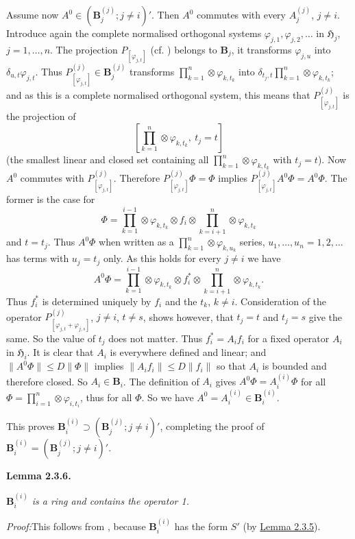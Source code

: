 \documentclass[12pt,b5paper,twoside]{article}
\newcommand{\Hspace}{\mathfrak H}
\newcommand{\B}{\mathbf B}
\newcommand{\Lemma}[1]{%
  \par\smallskip\noindent\phantomsection\label{lem:#1}\textbf{Lemma #1.}\enspace
}
\newcommand{\Proof}{\par\noindent\textit{Proof:}\enspace}
\newcommand{\lemref}[1]{\hyperref[lem:#1]{Lemma #1}}
\begin{document}
Assume now $A^0\in(\B_j^{(j)}; j\ne i)'$. Then $A^0$ commutes with every
$A_j^{(j)}$, $j\ne i$. Introduce again the complete normalised orthogonal
systems $\varphi_{j,1},\varphi_{j,2},\ldots$ in $\Hspace_j$,
$j=1,\ldots,n$. The projection $P_{[\varphi_{j,t}]}$ (cf.
\cite[p.~74]{ref16}) belongs to $\B_j$, it transforms $\varphi_{j,u}$ into
$\delta_{u,t}\varphi_{j,t}$. Thus $P_{[\varphi_{j,t}]}^{(j)}\in\B_j^{(j)}$
transforms $\prod_{k=1}^{n}\otimes\varphi_{k,t_k}$ into
$\delta_{t_j,t}\prod_{k=1}^{n}\otimes\varphi_{k,t_k}$; and as this is a
complete normalised orthogonal system, this means that
$P_{[\varphi_{j,t}]}^{(j)}$ is the projection of
\[
 \left[\prod_{k=1}^{n}\otimes\varphi_{k,t_k},\ t_j=t\right]
\]
(the smallest linear and closed set containing all
$\prod_{k=1}^{n}\otimes\varphi_{k,t_k}$ with $t_j=t$). Now $A^0$ commutes
with $P_{[\varphi_{j,t}]}^{(j)}$. Therefore
$P_{[\varphi_{j,t}]}^{(j)}\Phi=\Phi$ implies
$P_{[\varphi_{j,t}]}^{(j)}A^0\Phi=A^0\Phi$. The former is the case for
\[
 \Phi=\prod_{k=1}^{i-1}\otimes\varphi_{k,t_k}\otimes f_i\otimes
      \prod_{k=i+1}^{n}\otimes\varphi_{k,t_k}
\]
and $t=t_j$. Thus $A^0\Phi$ when written as a
$\prod_{k=1}^{n}\otimes\varphi_{k,u_k}$ series,
$u_1,\ldots,u_n=1,2,\ldots$ has terms with $u_j=t_j$ only. As this holds for
every $j\ne i$ we have
\[
 A^0\Phi=\prod_{k=1}^{i-1}\otimes\varphi_{k,t_k}\otimes f_i^*\otimes
           \prod_{k=i+1}^{n}\otimes\varphi_{k,t_k}.
\]
Thus $f_i^*$ is determined uniquely by $f_i$ and the $t_k$, $k\ne i$.
Consideration of the operator
$P_{[\varphi_{j,t}+\varphi_{j,s}]}^{(j)}$, $j\ne i$, $t\ne s$, shows however,
that $t_j=t$ and $t_j=s$ give the same. So the value of $t_j$ does not
matter. Thus $f_i^*=A_if_i$ for a fixed operator $A_i$ in $\Hspace_i$. It is
clear that $A_i$ is everywhere defined and linear; and
$\lVert A^0\Phi\rVert\leq D\lVert\Phi\rVert$ implies
$\lVert A_if_i\rVert\leq D\lVert f_i\rVert$ so that $A_i$ is bounded and
therefore closed. So $A_i\in\B_i$. The definition of $A_i$ gives
$A^0\Phi=A_i^{(i)}\Phi$ for all
$\Phi=\prod_{i=1}^{n}\otimes\varphi_{i,t_i}$, thus for all $\Phi$. So we
have $A^0=A_i^{(i)}\in\B_i^{(i)}$.

This proves $\B_i^{(i)}\supset(\B_j^{(j)}; j\ne i)'$, completing the proof
of $\B_i^{(i)}=(\B_j^{(j)}; j\ne i)'$.

\Lemma{2.3.6}
{\itshape
$\B_i^{(i)}$ is a ring and contains the operator 1.}

\Proof This follows from \cite[p.~397]{ref18}, because $\B_i^{(i)}$ has the
form $S'$ (by \lemref{2.3.5}).
\end{document}
